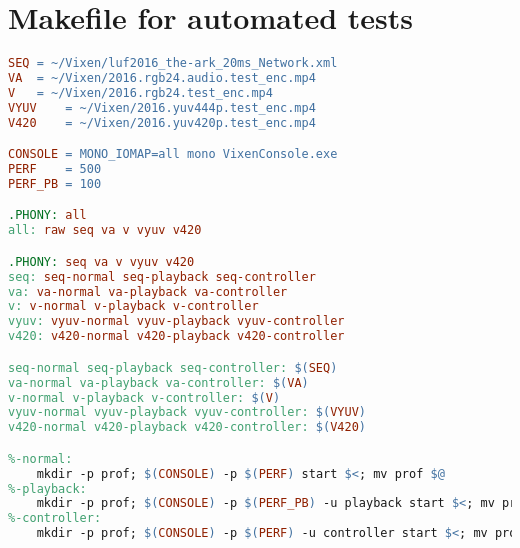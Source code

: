 \renewcommand{\baselinestretch}{1.5}
\chapter{Makefile for automated tests}
\label{App:tests}

\begin{lstfloat}
\begin{lstlisting}[language=make,label=lst:makefile,captionpos=b,caption={Makefile used for automated performance tests}]
SEQ	= ~/Vixen/luf2016_the-ark_20ms_Network.xml
VA	= ~/Vixen/2016.rgb24.audio.test_enc.mp4
V	= ~/Vixen/2016.rgb24.test_enc.mp4
VYUV	= ~/Vixen/2016.yuv444p.test_enc.mp4
V420	= ~/Vixen/2016.yuv420p.test_enc.mp4

CONSOLE	= MONO_IOMAP=all mono VixenConsole.exe
PERF	= 500
PERF_PB	= 100

.PHONY: all
all: raw seq va v vyuv v420

.PHONY: seq va v vyuv v420
seq: seq-normal seq-playback seq-controller
va: va-normal va-playback va-controller
v: v-normal v-playback v-controller
vyuv: vyuv-normal vyuv-playback vyuv-controller
v420: v420-normal v420-playback v420-controller

seq-normal seq-playback seq-controller: $(SEQ)
va-normal va-playback va-controller: $(VA)
v-normal v-playback v-controller: $(V)
vyuv-normal vyuv-playback vyuv-controller: $(VYUV)
v420-normal v420-playback v420-controller: $(V420)

%-normal:
	mkdir -p prof; $(CONSOLE) -p $(PERF) start $<; mv prof $@
%-playback:
	mkdir -p prof; $(CONSOLE) -p $(PERF_PB) -u playback start $<; mv prof $@
%-controller:
	mkdir -p prof; $(CONSOLE) -p $(PERF) -u controller start $<; mv prof $@
\end{lstlisting}
\end{lstfloat}

\iffalse
\lref{lst:makefile} shows one Makefile used for video transcoding and PSNR testing.

\begin{lstlisting}[float,floatplacement=ht,language=XML,label=lst:makefile,captionpos=b,caption={Makefile used for automated video transcoding}]
INPUT	?= $(wildcard *raw.mp4)
AUDIO	?= $(wildcard *audio.mp3)
OUTPUT	:= yuv444p-0.mp4 yuv444p-6.mp4 yuv444p-12.mp4 yuv420p-0.mp4
OUTPUT	+= rgb24-0.mp4 rgb24-6.mp4 rgb24-12.mp4 rgb24-24.mp4 rgb24-0-audio.mp4
ROOT	:= $(dir $(realpath $(lastword $(MAKEFILE_LIST))))

all: $(OUTPUT)
psnr: $(OUTPUT:%=psnr-%)

.SECONDARY:
.DELETE_ON_ERROR:
yuv420p-%.mp4: $(INPUT)
	ffmpeg -i "$<" -crf $* -codec:v libx264 -pix_fmt yuv420p -y "$@"
yuv444p-%.mp4: $(INPUT)
	ffmpeg -i "$<" -crf $* -codec:v libx264 -pix_fmt yuv444p -y "$@"
rgb24-%.mp4: $(INPUT)
	ffmpeg -i "$<" -crf $* -codec:v libx264rgb -pix_fmt rgb24 -y "$@"
rgb24-%-audio.mp4: $(INPUT) $(AUDIO)
	ffmpeg -i "$(INPUT)" -i $(AUDIO) -c:v copy -c:a copy "$@"
psnr-%: $(ROOT)psnr.sh % $(INPUT)
	$^ 2>&1 | tail -n 1
\end{lstlisting}
\fi
